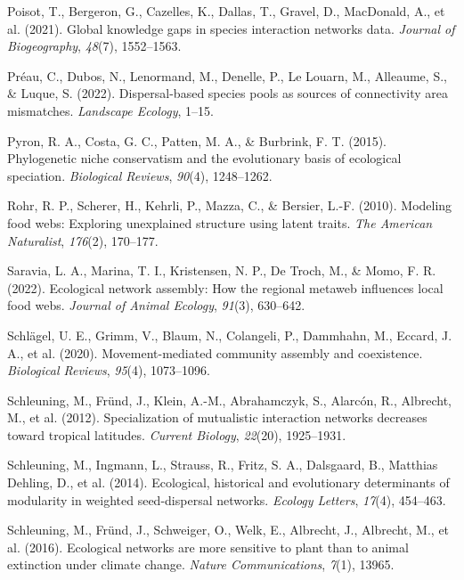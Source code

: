 \documentclass[
]{agujournal2019}
\newlength{\cslhangindent}
\newenvironment{CSLReferences}[2] %
 {\begin{list}{}{%
  \setlength{\itemindent}{0pt}
  \setlength{\leftmargin}{0pt}
  \setlength{\parsep}{0pt}
  \ifodd #1
   \setlength{\leftmargin}{\cslhangindent}
   \setlength{\itemindent}{-1\cslhangindent}
  \fi
  \setlength{\itemsep}{#2\baselineskip}}}
 {\end{list}}
\begin{document}
\begin{CSLReferences}{1}{0}
Poisot, T., Bergeron, G., Cazelles, K., Dallas, T., Gravel, D.,
MacDonald, A., et al. (2021). Global knowledge gaps in species
interaction networks data. \emph{Journal of Biogeography}, \emph{48}(7),
1552--1563.

Préau, C., Dubos, N., Lenormand, M., Denelle, P., Le Louarn, M.,
Alleaume, S., \& Luque, S. (2022). Dispersal-based species pools as
sources of connectivity area mismatches. \emph{Landscape Ecology},
1--15.

Pyron, R. A., Costa, G. C., Patten, M. A., \& Burbrink, F. T. (2015).
Phylogenetic niche conservatism and the evolutionary basis of ecological
speciation. \emph{Biological Reviews}, \emph{90}(4), 1248--1262.

Rohr, R. P., Scherer, H., Kehrli, P., Mazza, C., \& Bersier, L.-F.
(2010). Modeling food webs: Exploring unexplained structure using latent
traits. \emph{The American Naturalist}, \emph{176}(2), 170--177.

Saravia, L. A., Marina, T. I., Kristensen, N. P., De Troch, M., \& Momo,
F. R. (2022). Ecological network assembly: How the regional metaweb
influences local food webs. \emph{Journal of Animal Ecology},
\emph{91}(3), 630--642.

Schlägel, U. E., Grimm, V., Blaum, N., Colangeli, P., Dammhahn, M.,
Eccard, J. A., et al. (2020). Movement-mediated community assembly and
coexistence. \emph{Biological Reviews}, \emph{95}(4), 1073--1096.

Schleuning, M., Fründ, J., Klein, A.-M., Abrahamczyk, S., Alarcón, R.,
Albrecht, M., et al. (2012). Specialization of mutualistic interaction
networks decreases toward tropical latitudes. \emph{Current Biology},
\emph{22}(20), 1925--1931.

Schleuning, M., Ingmann, L., Strauss, R., Fritz, S. A., Dalsgaard, B.,
Matthias Dehling, D., et al. (2014). Ecological, historical and
evolutionary determinants of modularity in weighted seed-dispersal
networks. \emph{Ecology Letters}, \emph{17}(4), 454--463.

Schleuning, M., Fründ, J., Schweiger, O., Welk, E., Albrecht, J.,
Albrecht, M., et al. (2016). Ecological networks are more sensitive to
plant than to animal extinction under climate change. \emph{Nature
Communications}, \emph{7}(1), 13965.


\end{CSLReferences}
\end{document}
